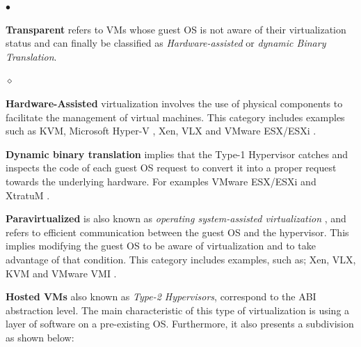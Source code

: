	\begin{list}{$\bullet$}{\setlength{\leftmargin}{5pt}}

			\item \textbf {Transparent} refers to VMs whose guest OS is not aware of their virtualization status and can finally be classified as \textit{Hardware-assisted} or \textit{dynamic Binary Translation}.
			
			\begin{list}{$\diamond$}{\setlength{\leftmargin}{8pt}}

				\item \textbf{Hardware-Assisted} virtualization involves the use of physical components to facilitate the management of virtual machines. This category includes examples such as KVM, Microsoft Hyper-V \cite{Kappel2009}, Xen, VLX and VMware ESX/ESXi \cite{VMware2018Website}.
				
				\item \textbf{Dynamic binary translation} implies that the Type-1 Hypervisor catches and inspects the code of each guest OS request to convert it into a proper request towards the underlying hardware. For examples VMware ESX/ESXi and XtratuM \cite{XtratuM}.
				 
			\end{list}
			
			\item \textbf{Paravirtualized} is also known as \textit{operating system-assisted virtualization} \cite{VMware2008}, \cite{VMware2018Website} and refers to efficient communication between the guest OS and the hypervisor. This implies modifying the guest OS to be aware of virtualization and to take advantage of that condition. This category includes examples, such as; Xen, VLX, KVM and VMware VMI \cite{VMware2018Website}.
			
		\end{list}	
	

	

\textbf{Hosted VMs} also known as \textit{Type-2 Hypervisors}, correspond to the ABI abstraction level. The main characteristic of this type of virtualization is using a layer of software on a pre-existing OS. Furthermore, it also presents a subdivision as shown below:
		

